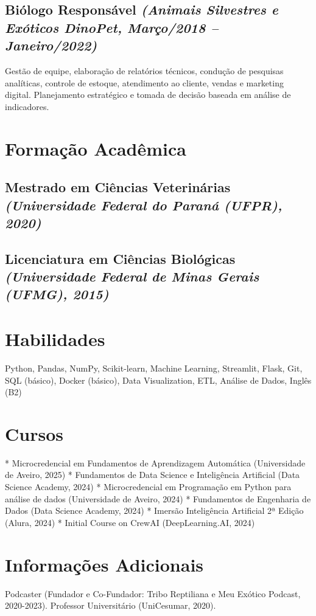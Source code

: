 \documentclass{article}
\begin{document}
\subsection*{Biólogo Responsável \textit{(Animais Silvestres e Exóticos DinoPet, Março/2018 – Janeiro/2022)}}
Gestão de equipe, elaboração de relatórios técnicos, condução de pesquisas analíticas, controle de estoque, atendimento ao cliente, vendas e marketing digital. Planejamento estratégico e tomada de decisão baseada em análise de indicadores.

\section*{Formação Acadêmica}
\subsection*{Mestrado em Ciências Veterinárias \textit{(Universidade Federal do Paraná (UFPR), 2020)}}
\subsection*{Licenciatura em Ciências Biológicas \textit{(Universidade Federal de Minas Gerais (UFMG), 2015)}}

\section*{Habilidades}
Python, Pandas, NumPy, Scikit-learn, Machine Learning, Streamlit, Flask, Git, SQL (básico), Docker (básico), Data Visualization, ETL, Análise de Dados,  Inglês (B2)

\section*{Cursos}
* Microcredencial em Fundamentos de Aprendizagem Automática (Universidade de Aveiro, 2025)
* Fundamentos de Data Science e Inteligência Artificial (Data Science Academy, 2024)
* Microcredencial em Programação em Python para análise de dados (Universidade de Aveiro, 2024)
* Fundamentos de Engenharia de Dados (Data Science Academy, 2024)
* Imersão Inteligência Artificial 2ª Edição (Alura, 2024)
* Initial Course on CrewAI (DeepLearning.AI, 2024)

\section*{Informações Adicionais}
Podcaster (Fundador e Co-Fundador: Tribo Reptiliana e Meu Exótico Podcast, 2020-2023). Professor Universitário (UniCesumar, 2020).
\end{document}
